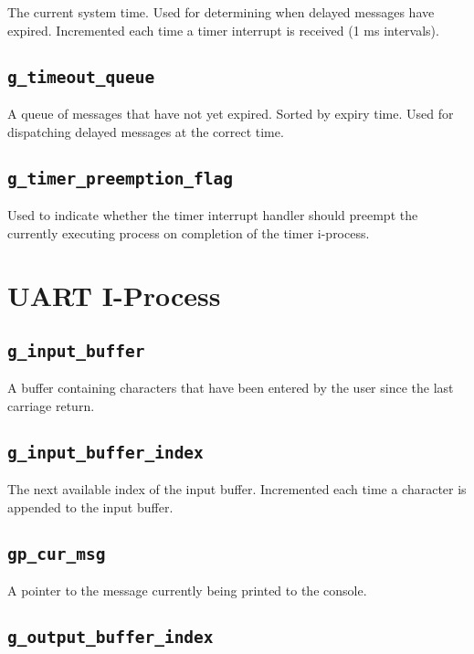 \documentclass[12pt]{report}
\begin{document}
The current system time. Used for determining when delayed messages have expired. Incremented each time a timer interrupt is received (1 ms intervals).

\subsection{\texttt{g_timeout_queue}}
\label{app:gtimeoutqueue}

A queue of messages that have not yet expired. Sorted by expiry time. Used for dispatching delayed messages at the correct time.

\subsection{\texttt{g_timer_preemption_flag}}

Used to indicate whether the timer interrupt handler should preempt the currently executing process on completion of the timer i-process.

\section{UART I-Process}
\label{app:uartglobals}

\subsection{\texttt{g_input_buffer}}

A buffer containing characters that have been entered by the user since the last carriage return.

\subsection{\texttt{g_input_buffer_index}}

The next available index of the input buffer. Incremented each time a character is appended to the input buffer. 

\subsection{\texttt{gp_cur_msg}}

A pointer to the message currently being printed to the console.

\subsection{\texttt{g_output_buffer_index}}
\end{document}
